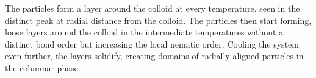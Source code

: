 The particles form a layer around the colloid at every temperature, seen in the distinct peak at radial distance from the colloid. The particles then start forming, loose layers around the colloid in the intermediate temperatures without a distinct bond order but increasing the local nematic order. Cooling the system even further, the layers solidify, creating domains of radially aligned particles in the columnar phase.
 


